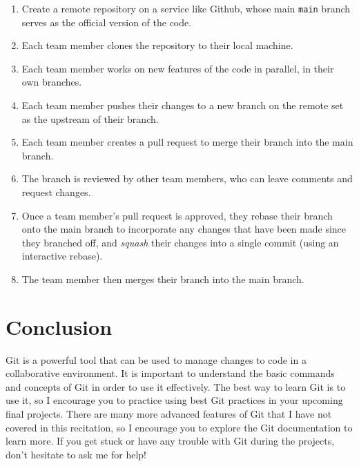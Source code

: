 \documentclass[fleqn]{article}
\begin{document}
\begin{enumerate}

    \item Create a remote repository on a service like Github, whose main
          \texttt{main} branch serves as the official version of the code.
    \item Each team member clones the repository to their local machine.
    \item Each team member works on new features of the code in parallel, in
          their own branches.
    \item Each team member pushes their changes to a new branch on the remote
          set as the upstream of their branch.
    \item Each team member creates a pull request to merge their branch into
          the main branch.
    \item The branch is reviewed by other team members, who can leave comments
          and request changes.
    \item Once a team member's pull request is approved, they rebase their
          branch onto the main branch to incorporate any changes that have been
          made since they branched off, and  \emph{squash} their changes into a
          single commit (using an interactive rebase).
    \item The team member then merges their branch into the main branch.
\end{enumerate}

\section*{Conclusion}

Git is a powerful tool that can be used to manage changes to code in a
collaborative environment. It is important to understand the basic commands
and concepts of Git in order to use it effectively. The best way to learn Git
is to use it, so I encourage you to practice using best Git practices in your
upcoming final projects. There are many more advanced features of Git that I
have not covered in this recitation, so I encourage you to explore the Git
documentation to learn more. If you get stuck or have any trouble with Git
during the projects, don't hesitate to ask me for help!
\end{document}
